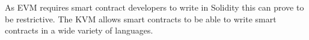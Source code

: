As EVM requires smart contract developers to write in Solidity this can prove to be restrictive. The KVM allows smart contracts to be able to write smart contracts in a wide variety of languages.